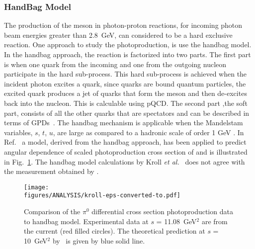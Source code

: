 \subsubsection{HandBag Model}
The production of the \piz meson in photon-proton reactions, for incoming photon beam energies greater than 2.8~GeV, can considered to be a hard exclusive reaction. One approach to study the \piz photoproduction, is use the handbag model. In the handbag approach, the reaction is factorized into two parts. The first part is when one quark from the incoming and one from the outgoing nucleon participate in the hard sub-process. This hard sub-process is achieved when the incident photon excites a quark, since quarks are bound quantum particles, the excited quark produces a jet of quarks that form the meson and then de-excites back into the nucleon. This is calculable using pQCD. The second part ,the soft part, consists of all the other quarks that are spectators and can be described in terms of GPDs~\cite{key1, key2,Rad1996, Diehl}. The handbag mechanism is applicable when the Mandelstam variables, $s$, $t$, $u$, are large as compared to a hadronic scale of order 1 GeV . In Ref.~\cite{Huang2000} a model, derived from the handbag approach, has been applied to predict angular dependence of scaled photoproduction cross section of \piz and is illustrated in Fig.~\ref{fig:pi0_handbag}. The handbag model calculations by Kroll \textit{et al.}~\cite{Huang2000} does not agree with the measurement obtained by .
\begin{figure}[h]
	\texttt{[image: \\figures/ANALYSIS/kroll-eps-converted-to.pdf]}
	\caption{Comparison of the $\pi^0$ differential cross section  photoproduction data to  handbag model. Experimental data at $s$ = 11.08~GeV$^2$ are from the current (red filled circles). The theoretical prediction at $s$ = 10~GeV$^2$ by~\protect\cite{Huang2000} is given by blue solid line. } \label{fig:pi0_handbag}
\end{figure}
\FloatBarrier